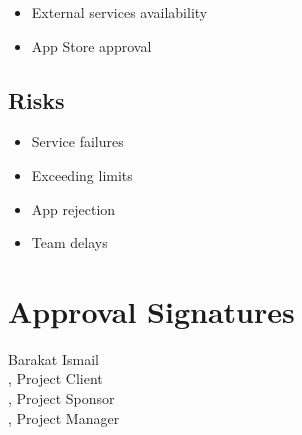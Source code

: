 \documentclass[11pt,a4paper]{article}
\begin{document}
    \begin{itemize}
        \item External services availability
        \item App Store approval
    \end{itemize}

    \subsection*{Risks}

    \begin{itemize}
        \item Service failures
        \item Exceeding limits
        \item App rejection
        \item Team delays
    \end{itemize}

    \section*{Approval Signatures}

    Barakat Ismail \\
    [Name], Project Client \\
    [Name], Project Sponsor \\
    [Name], Project Manager
\end{document}
